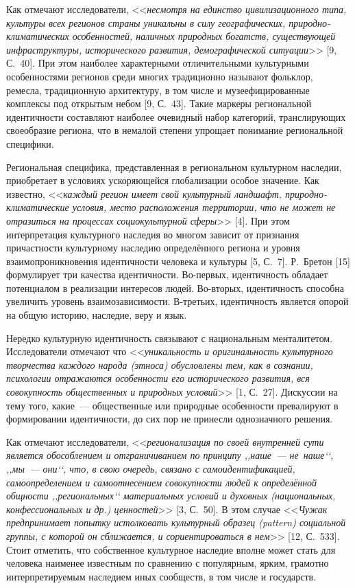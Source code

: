 Как отмечают исследователи, <<\textit{несмотря на единство цивилизационного типа, культуры всех регионов страны уникальны в силу географических, природно-климатических особенностей, наличных природных богатств, существующей инфраструктуры, исторического развития, демографической ситуации}>> [9, С.~40]. При этом наиболее характерными отличительными культурными особенностями регионов среди многих традиционно называют фольклор, ремесла, традиционную архитектуру, в том числе и музеефицированные комплексы под открытым небом [9, С.~43]. Такие маркеры региональной идентичности составляют наиболее очевидный набор категорий, транслирующих своеобразие региона, что в немалой степени упрощает понимание региональной специфики.

Региональная специфика, представленная в региональном культурном наследии, приобретает в условиях ускоряющейся глобализации особое значение. Как известно, <<\textit{каждый регион имеет свой культурный ландшафт, природно-климатические условия, место расположения территории, что не может не отразиться на процессах социокультурной сферы}>> [4]. При этом интерпретация культурного наследия во многом зависит от признания причастности культурному наследию определённого региона и уровня взаимопроникновения идентичности человека и культуры [5, С.~7]. Р.~Бретон [15] формулирует три качества идентичности. Во-первых, идентичность обладает потенциалом в реализации интересов людей. Во-вторых, идентичность способна увеличить уровень взаимозависимости. В-третьих, идентичность является опорой на общую историю, наследие, веру и язык.

Нередко культурную идентичность связывают с национальным менталитетом. Исследователи отмечают что <<\textit{уникальность и оригинальность культурного творчества каждого народа (этноса) обусловлены тем, как в сознании, психологии отражаются особенности его исторического развития, вся совокупность общественных и природных условий}>> [1, С.~27]. Дискуссии на тему того, какие~--- общественные или природные особенности превалируют в формировании идентичности, до сих пор не принесли однозначного решения.

Как отмечают исследователи, <<\textit{регионализация по своей внутренней сути является обособлением и отграничиванием по принципу ,,наше~--- не~наше‘‘, ,,мы~--- они‘‘, что, в свою очередь, связано с самоидентификацией, самоопределением и самоотнесением совокупности людей к определённой общности ,,региональных‘‘ материальных условий и духовных (национальных, конфессиональных и др.) ценностей}>> [3, С.~50]. В этом случае <<\textit{Чужак предпринимает попытку истолковать культурный образец (pattern) социальной группы, с которой он сближается, и сориентироваться в нем}>> [12, С.~533]. Стоит отметить, что собственное культурное наследие вполне может стать для человека наименее известным по сравнению с популярным, ярким, грамотно интерпретируемым наследием иных сообществ, в том числе и государств.

